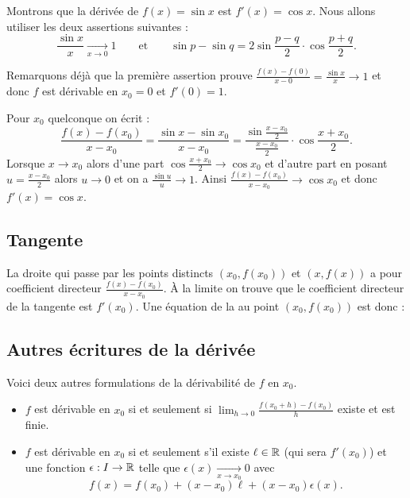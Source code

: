 \documentclass[class=report,crop=false]{standalone}
\begin{document}
\begin{exemple}
Montrons que la dérivée de $f(x)=\sin x$ est $f'(x)=\cos x$.
Nous allons utiliser les deux assertions suivantes :
$$\frac{\sin x}{x} \xrightarrow[x\to 0]{} 1 \qquad \text{et} \qquad \sin p-\sin q = 2\sin \frac{p-q}{2}\cdot\cos\frac{p+q}{2}.$$

Remarquons déjà que la première assertion prouve $\frac{f(x)-f(0)}{x-0} = \frac{\sin x}{x} \to 1$ et donc $f$ est dérivable en $x_0=0$
et $f'(0)=1$.

Pour $x_0$ quelconque on écrit :
$$\frac{f(x)-f(x_0)}{x-x_0} = \frac{\sin x - \sin x_0}{x-x_0} = \frac{\sin \frac{x-x_0}{2}}{\frac{x-x_0}{2}} \cdot \cos \frac{x+x_0}{2}.$$
Lorsque $x\to x_0$ alors d'une part $\cos \frac{x+x_0}{2}\to \cos x_0$ et d'autre part
en posant $u=\frac{x-x_0}{2}$ alors $u\to 0$ et on a $\frac {\sin u}u \to 1$.
Ainsi $\frac{f(x)-f(x_0)}{x-x_0} \to \cos x_0$ et donc
$f'(x)=\cos x$.
\end{exemple}



\subsection{Tangente}

La droite qui passe par les points distincts $(x_0,f(x_0))$ et $(x,f(x))$
a pour coefficient directeur $\frac{f(x)-f(x_0)}{x-x_0}$.
\`A la limite on trouve que le coefficient directeur de la tangente est $f'(x_0)$.
Une équation de la  au point $(x_0,f(x_0))$ est donc :


\subsection{Autres écritures de la dérivée}

Voici deux autres formulations de la dérivabilité de $f$ en $x_0$.

\begin{proposition}
\label{prop:ecrideriv}
\sauteligne
\begin{itemize}
  \item $f$ est dérivable en $x_0$ si et seulement si $\displaystyle \lim_{h\to 0} \frac{f(x_0+h)-f(x_0)}{h}$ existe et est finie.
  \item $f$ est dérivable en $x_0$ si et seulement s'il existe $\ell \in \mathbb{R}$ (qui sera $f'(x_0)$)
et une fonction $\epsilon : I \to \mathbb{R}$ telle que $\epsilon(x) \xrightarrow[x\to x_0]{} 0$ avec
$$f(x)=f(x_0)+(x-x_0) \ell + (x-x_0) \epsilon(x).$$
\end{itemize}
\end{proposition}
\end{document}
